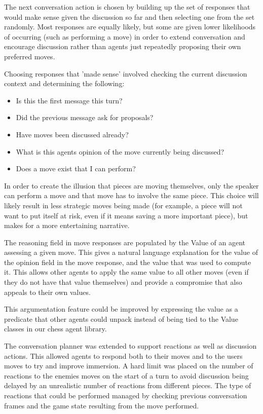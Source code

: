 \documentclass{article}
\begin{document}
The next conversation action is chosen by building up the set of responses that would make sense given the discussion so far and then selecting one from the set randomly. Most responses are equally likely, but some are given lower likelihoods of occurring (such as performing a move) in order to extend conversation and encourage discussion rather than agents just repeatedly proposing their own preferred moves.

Choosing responses that 'made sense' involved checking the current discussion context and determining the following:
\begin{itemize}
	\item Is this the first message this turn?
	\item Did the previous message ask for proposals?
	\item Have moves been discussed already?
	\item What is this agents opinion of the move currently being discussed?
	\item Does a move exist that I can perform?
\end{itemize}

In order to create the illusion that pieces are moving themselves, only the speaker can perform a move and that move has to involve the same piece. This choice will likely result in less strategic moves being made (for example, a piece will not want to put itself at risk, even if it means saving a more important piece), but makes for a more entertaining narrative.

The reasoning field in move responses are populated by the Value of an agent assessing a given move. This gives a natural language explanation for the value of the opinion field in the move response, and the value that was used to compute it. This allows other agents to apply the same value to all other moves (even if they do not have that value themselves) and provide a compromise that also appeals to their own values. 

This argumentation feature could be improved by expressing the value as a predicate that other agents could unpack instead of being tied to the Value classes in our chess agent library. 

The conversation planner was extended to support reactions as well as discussion actions. This allowed agents to respond both to their moves and to the users moves to try and improve immersion.  A hard limit was placed on the number of reactions to the enemies moves on the start of a turn to avoid discussion being delayed by an unrealistic number of reactions from different pieces. The type of reactions that could be performed managed by checking previous conversation frames and the game state resulting from the move performed.
\end{document}

